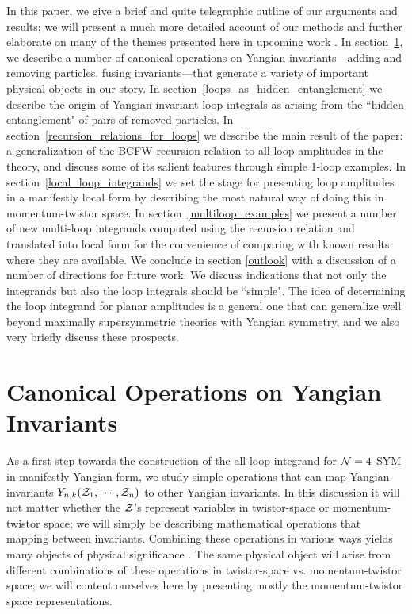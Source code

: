 \documentclass[11pt, reqno]{article}
\begin{document}
In this paper, we give a brief and quite telegraphic outline of our arguments and results; we will present a much more detailed account of our methods and further elaborate on many of the themes presented here in upcoming work \cite{InPrep}. In \mbox{section \ref{canonical_operations_on_Yangian_invariants}}, we describe a number of canonical operations on Yangian invariants---adding and removing particles, fusing invariants---that generate a variety of important physical objects in our story. In \mbox{section \ref{loops_as_hidden_entanglement}} we describe the origin of Yangian-invariant loop integrals as arising from the ``hidden entanglement" of pairs of removed particles. In \mbox{section \ref{recursion_relations_for_loops}} we describe the main result of the paper: a generalization of the BCFW recursion relation to all loop amplitudes in the theory, and discuss some of its salient features through simple 1-loop examples. In \mbox{section \ref{local_loop_integrands}} we set the stage for presenting loop amplitudes in a manifestly local form by describing the most natural way of doing this in momentum-twistor space. In \mbox{section \ref{multiloop_examples}} we present a number of new multi-loop integrands computed using the recursion relation and translated into local form for the convenience of comparing with known results where they are available. We conclude in section \ref{outlook} with a discussion of a number of directions for future work. We discuss indications that not only the integrands but also the loop integrals should be ``simple". The idea of determining the loop integrand for planar amplitudes is a general one that can generalize well beyond maximally supersymmetric theories with Yangian symmetry, and we also very briefly discuss these prospects.

\section{Canonical Operations on Yangian Invariants}\label{canonical_operations_on_Yangian_invariants}

As a first step towards the construction of the all-loop integrand for ${\cal N}=4$ SYM in manifestly Yangian form, we study simple operations that can map Yangian invariants $Y_{n,k}({\cal Z}_1, \cdots, {\cal Z}_n)$ to other Yangian invariants. In this discussion it will not matter whether the ${\cal Z}$'s represent variables in twistor-space or momentum-twistor space; we will simply be describing mathematical operations that mapping between invariants. Combining these operations in various ways yields many objects of physical significance \cite{InPrep}. The same physical object will arise from different combinations of these operations in twistor-space vs. momentum-twistor space; we will content ourselves here by presenting mostly the momentum-twistor space representations.
\end{document}
